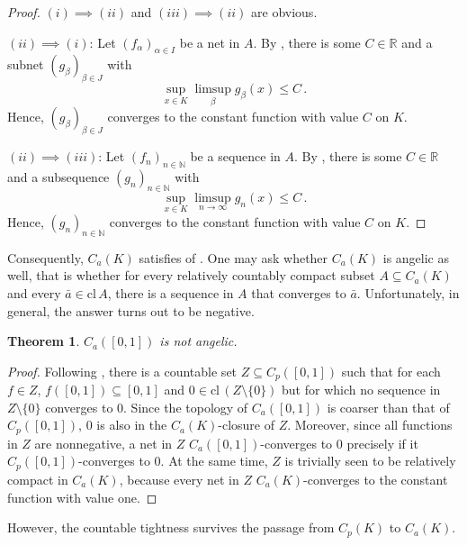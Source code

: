 \documentclass[
	paper=A4,
	pagesize=auto,
	fontsize=12pt
]{scrartcl}
\theoremstyle{plain}
\newtheorem{theorem}{Theorem}[section]
\theoremstyle{remark}
\theoremstyle{definition}
\begin{document}
\begin{proof}
$(i) \implies (ii)$ and $(iii) \implies (ii)$ are obvious.

$(ii) \implies (i)$:
Let $(f_\alpha)_{\alpha \in I}$ be a net in $A$.
By , there is some $C \in \mathbb{R}$ and a subnet $(g_\beta)_{\beta \in J}$ with
%
\begin{equation}
\sup_{x \in K} \limsup_\beta g_\beta \left( x \right) \le C \, .
\end{equation}
%
Hence, $(g_\beta)_{\beta \in J}$ converges to the constant function with value $C$ on $K$.

$(ii) \implies (iii)$:
Let $(f_n)_{n \in \mathbb{N}}$ be a sequence in $A$.
By , there is some $C \in \mathbb{R}$ and a subsequence $(g_n)_{n \in \mathbb{N}}$ with
%
\begin{equation}
\sup_{x \in K} \limsup_{n \to \infty} g_n \left( x \right) \le C \, .
\end{equation}
%
Hence, $(g_n)_{n \in \mathbb{N}}$ converges to the constant function with value $C$ on $K$.
\end{proof}
%
Consequently, $C_a(K)$ satisfies  of .
One may ask whether $C_a(K)$ is angelic as well, that is whether for every relatively countably compact subset $A \subseteq C_a(K)$ and every $\bar{a} \in \mathrm{cl}\, A$, there is a sequence in $A$ that converges to $\bar{a}$.
Unfortunately, in general, the answer turns out to be negative.
%
\begin{theorem}
\label{thm:Ca01IsNotAngelic}
$C_a([0,1])$ is not angelic.
\end{theorem}
\begin{proof}
Following \cite[Lemma II.3.5]{src:Arkhangelskii1:TopologicalFunctionSpaces}, there is a countable set $Z \subseteq C_p([0,1])$ such that for each $f \in Z$, $f([0,1]) \subseteq [0,1]$ and $0 \in \mathrm{cl}\, (Z \setminus \{ 0 \})$ but for which no sequence in $Z \setminus \{ 0 \}$ converges to $0$.
Since the topology of $C_a([0,1])$ is coarser than that of $C_p([0,1])$, $0$ is also in the $C_a(K)$-closure of $Z$.
Moreover, since all functions in $Z$ are nonnegative, a net in $Z$ $C_a([0,1])$-converges to $0$ precisely if it $C_p([0,1])$-converges to $0$.
At the same time, $Z$ is trivially seen to be relatively compact in $C_a(K)$, because every net in $Z$ $C_a(K)$-converges to the constant function with value one.
\end{proof}
%
However, the countable tightness survives the passage from $C_p(K)$ to $C_a(K)$.
%
\end{document}
